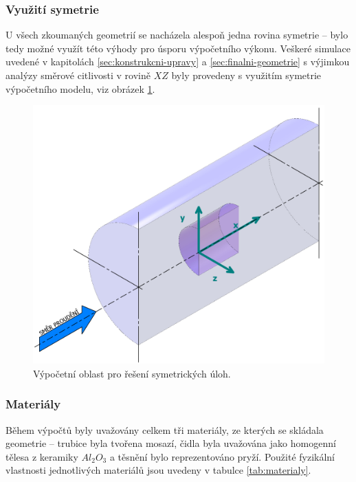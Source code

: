         \subsubsection{Využití symetrie}
            U všech zkoumaných geometrií se nacházela alespoň jedna rovina symetrie – bylo tedy možné využít této výhody pro úsporu výpočetního výkonu. Veškeré simulace uvedené v kapitolách \ref{sec:konstrukcni-upravy} a \ref{sec:finalni-geometrie} s výjimkou analýzy směrové citlivosti v rovině $XZ$ byly provedeny s využitím symetrie výpočetního modelu, viz obrázek \ref{fig:vypocetni-oblast-symetrie}.
            
            \begin{figure}[ht!]
                \centering
                \includegraphics[width=\textwidth]{300_VYPOCETNI_MODEL/Vypocetni_oblast_symetrie.png}
                \caption{Výpočetní oblast pro řešení symetrických úloh.}
                \label{fig:vypocetni-oblast-symetrie}
            \end{figure}
         
	\newpage
        \subsubsection{Materiály}
            Během výpočtů byly uvažovány celkem tři materiály, ze kterých se skládala geometrie – trubice byla tvořena mosazí, čidla byla uvažována jako homogenní tělesa z keramiky $Al_2 O_3$ a těsnění bylo reprezentováno pryží. Použité fyzikální vlastnosti jednotlivých materiálů jsou uvedeny v tabulce \ref{tab:materialy}.
            
